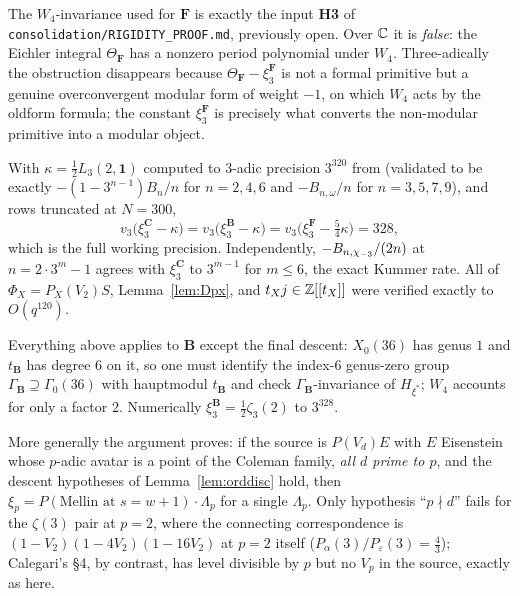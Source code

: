 \begin{remark}
The $W_4$-invariance used for $\mathbf F$ is exactly the input \textbf{H3} of
\texttt{consolidation/RIGIDITY\_PROOF.md}, previously open.  Over $\mathbb{C}$ it is
\emph{false}: the Eichler integral $\Theta_{\mathbf F}$ has a nonzero period
polynomial under $W_4$.  Three-adically the obstruction disappears because
$\Theta_{\mathbf F}-\xi^{\mathbf F}_3$ is not a formal primitive but a genuine
overconvergent modular form of weight $-1$, on which $W_4$ acts by the oldform
formula; the constant $\xi^{\mathbf F}_3$ is precisely what converts the
non-modular primitive into a modular object.
\end{remark}

\begin{verification}\label{ver:conjD3}
With $\kappa=\tfrac12L_3(2,\mathbf 1)$ computed to $3$-adic precision $3^{320}$
from \cite[Thm.~5.11]{Washington1997} (validated to be exactly
$-(1-3^{n-1})B_n/n$ for $n=2,4,6$ and $-B_{n,\omega}/n$ for $n=3,5,7,9$), and rows
truncated at $N=300$,
\[
v_3\bigl(\xi^{\mathbf C}_3-\kappa\bigr)=
v_3\bigl(\xi^{\mathbf B}_3-\kappa\bigr)=
v_3\bigl(\xi^{\mathbf F}_3-\tfrac54\kappa\bigr)=328,
\]
which is the full working precision.  Independently, $-B_{n,\chi_{-3}}/(2n)$ at
$n=2\cdot3^m-1$ agrees with $\xi^{\mathbf C}_3$ to $3^{m-1}$ for $m\le6$, the exact
Kummer rate.  All of $\Phi_X=P_X(V_2)S$, Lemma~\ref{lem:Dpx}, and
$t_Xj\in\mathbb{Z}[[t_X]]$ were verified exactly to $O(q^{120})$.
\end{verification}

\begin{remark}\label{rem:conjDgaps}
Everything above applies to $\mathbf B$ except the final descent: $X_0(36)$ has
genus $1$ and $t_{\mathbf B}$ has degree $6$ on it, so one must identify the
index-$6$ genus-zero group $\Gamma_{\mathbf B}\supseteq\Gamma_0(36)$ with hauptmodul
$t_{\mathbf B}$ and check $\Gamma_{\mathbf B}$-invariance of $H_{\xi^*}$; $W_4$
accounts for only a factor $2$.  Numerically $\xi^{\mathbf B}_3=\tfrac12\zeta_3(2)$
to $3^{328}$.  \Open{}

More generally the argument proves: if the source is $P(V_{d})E$ with $E$
Eisenstein whose $p$-adic avatar is a point of the Coleman family, \emph{all $d$
prime to $p$}, and the descent hypotheses of Lemma~\ref{lem:orddisc} hold, then
$\xi_p=P(\text{Mellin at }s=w+1)\cdot\Lambda_p$ for a single $\Lambda_p$.  Only
hypothesis ``$p\nmid d$'' fails for the $\zeta(3)$ pair at $p=2$, where the
connecting correspondence is $(1-V_2)(1-4V_2)(1-16V_2)$ at $p=2$ itself
($P_\alpha(3)/P_\varepsilon(3)=\tfrac43$); Calegari's \S4, by contrast, has level
divisible by $p$ but no $V_p$ in the source, exactly as here.  \Open{}
\end{remark}

